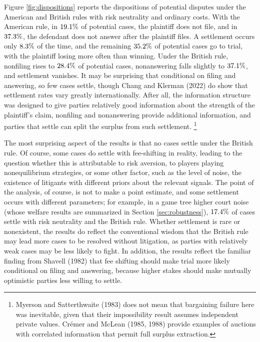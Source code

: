 \documentclass{article}
\begin{document}
Figure \ref{fig:dispositions} reports the dispositions of potential disputes under the American and British rules with risk neutrality and ordinary costs. With the American rule, in $19.1\%$ of potential cases, the plaintiff does not file, and in $37.3\%$, the defendant does not answer after the plaintiff files. A settlement occurs only $8.3\%$ of the time, and the remaining $35.2\%$ of potential cases go to trial, with the plaintiff losing more often than winning. Under the British rule, nonfiling rises to $28.4\%$ of potential cases, nonanswering falls slightly to $37.1\%$, and settlement vanishes. It may be surprising that conditional on filing and answering, so few cases settle, though Chang and Klerman (2022) \cite{changklerman} do show that settlement rates vary greatly internationally.  After all, the information structure was designed to give parties relatively good information about the strength of the plaintiff's claim, nonfiling and nonanswering provide additional information, and parties that settle can split the surplus from such settlement. \footnote{Myerson and Satterthwaite (1983) \cite{myersonsatterthwaite} does not mean that bargaining failure here was inevitable, given that their impossibility result assumes independent private values. Crémer and McLean (1985, 1988) \cite{cremermclean1985,cremermclean1988} provide examples of auctions with correlated information that permit full surplus extraction.}

The most surprising aspect of the results is that no cases settle under the British rule. Of course, some cases do settle with fee-shifting in reality, leading to the question whether this is attributable to risk aversion, to players playing nonequilibrium strategies, or some other factor, such as the level of noise, the existence of litigants with different priors about the relevant signals. The point of the analysis, of course, is not to make a point estimate, and some settlement occurs with different parameters; for example,  in a game tree higher court noise (whose welfare results are summarized in Section \ref{sec:robustness}), $17.4\%$ of cases settle with risk neutrality and the British rule. Whether settlement is rare or nonexistent, the results do reflect the conventional wisdom that the British rule may lead more cases to be resolved without litigation, as parties with relatively weak cases may be less likely to fight.  In addition, the results reflect the familiar finding from Shavell (1982) \cite[65--66]{shavell} that fee shifting should make trial more likely conditional on filing and answering, because higher stakes should make mutually optimistic parties less willing to settle.
\end{document}
